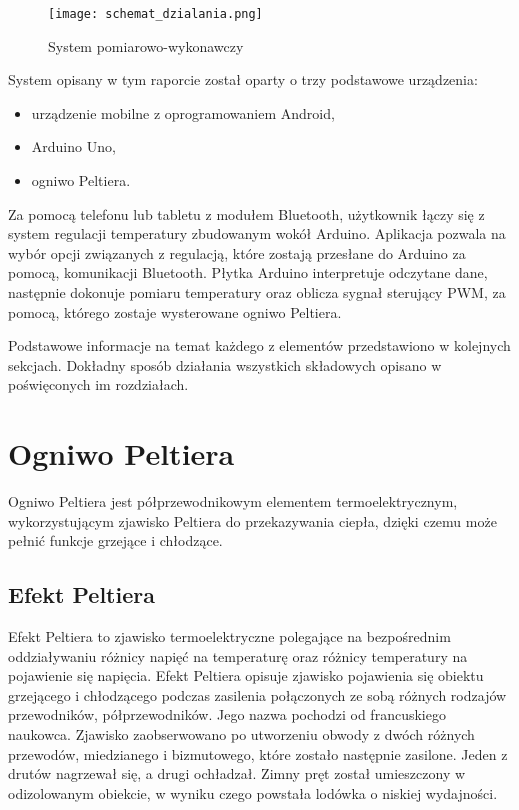 \begin{figure}[H]
	\centering
	\texttt{[image: schemat\_dzialania.png]}
	\caption{System pomiarowo-wykonawczy}
\end{figure}
System opisany w tym raporcie został oparty o trzy podstawowe urządzenia:
\begin{itemize}
\item urządzenie mobilne z oprogramowaniem Android,
\item Arduino Uno,
\item ogniwo Peltiera.
\end{itemize}
Za pomocą telefonu lub tabletu z modułem Bluetooth, użytkownik łączy się z system regulacji temperatury zbudowanym wokół Arduino. Aplikacja pozwala na wybór opcji związanych z regulacją, które zostają przesłane do Arduino za pomocą, komunikacji Bluetooth. Płytka Arduino interpretuje odczytane dane, następnie dokonuje pomiaru temperatury oraz oblicza sygnał sterujący PWM, za pomocą, którego zostaje wysterowane ogniwo Peltiera.

Podstawowe informacje na temat każdego z elementów przedstawiono w kolejnych sekcjach. Dokładny sposób działania wszystkich składowych opisano w poświęconych im rozdziałach.



\section{Ogniwo Peltiera} %
Ogniwo Peltiera jest półprzewodnikowym elementem termoelektrycznym, wykorzystującym zjawisko Peltiera do przekazywania ciepła, dzięki czemu może pełnić funkcje grzejące i chłodzące.
\subsection{Efekt Peltiera} %
Efekt Peltiera to zjawisko termoelektryczne polegające na bezpośrednim oddziaływaniu różnicy napięć na temperaturę oraz różnicy temperatury na pojawienie się napięcia. Efekt Peltiera opisuje zjawisko pojawienia się 
obiektu grzejącego i chłodzącego podczas zasilenia połączonych ze sobą różnych rodzajów przewodników, półprzewodników. Jego nazwa pochodzi od francuskiego naukowca. Zjawisko zaobserwowano po utworzeniu obwody z dwóch różnych przewodów, miedzianego i bizmutowego, które zostało następnie zasilone. Jeden z drutów nagrzewał się, a drugi ochładzał. Zimny pręt został umieszczony w odizolowanym obiekcie, w wyniku czego powstała lodówka o niskiej wydajności.

